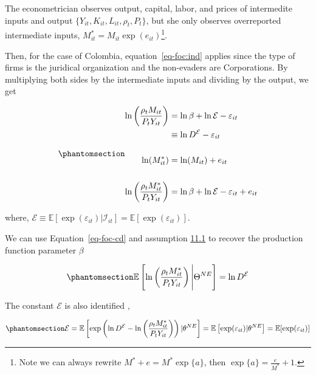 \documentclass[
  12pt]{article}
\theoremstyle{definition}
\theoremstyle{remark}
\begin{document}
The econometrician observes output, capital, labor, and prices of
intermedite inputs and output \(\{Y_{it},K_{it},L_{it},\rho_t, P_t\}\),
but she only observes overreported intermediate inputs,
\(M^*_{it}=M_{it}\exp(e_{it})\)\footnote{Note we can always rewrite
  \(M^*+e=M^*\exp\{a\}\), then \(\exp\{a\}=\frac{e}{M^*}+1\).}.

Then, for the case of Colombia, equation~\ref{eq-foc:ind} applies since
the type of firms is the juridical organization and the non-evaders are
Corporations. By multiplying both sides by the intermediate inputs and
dividing by the output, we get

\begin{equation}\phantomsection\label{eq-foc-cd}{
\begin{aligned}
    \ln\left(\frac{\rho_t M_{it}}{P_{t}Y_{it}}\right) &=\ln\beta + \ln \mathcal{E}- \varepsilon_{it} \\
    &\equiv \ln D^{\mathcal{E}}- \varepsilon_{it} \\
    &\\
    \ln(M^*_{it})&=\ln(M_{it})+e_{it} \\ 
    &\\
    \ln\left(\frac{\rho_t M^*_{it}}{P_{t}Y_{it}}\right) &=\ln\beta + \ln \mathcal{E}- \varepsilon_{it}+e_{it} \\
\end{aligned}
}\end{equation}

where,
\(\mathcal{E}\equiv \mathbb{E}[\exp(\varepsilon_{it})|\mathcal{I}_{it}]=\mathbb{E}[\exp(\varepsilon_{it})]\).

We can use Equation~\ref{eq-foc-cd} and assumption
\hyperref[ass-non-ev]{11.1} to recover the production function parameter
\(\beta\)

\begin{equation}\phantomsection\label{eq-foc-cd-exp}{
    \mathbb{E}\left[\ln\left(\frac{\rho_t M^*_{it}}{P_{t}Y_{it}}\right)\Bigg| \Theta^{NE}\right]=\ln D^{\mathcal{E}}
}\end{equation}

The constant \(\mathcal{E}\) is also identified \citep{Gandhi2020},

\begin{equation}\phantomsection\label{eq-id-E}{
\mathcal{E}=\mathbb{E}\left[\exp\left(\ln D^{\mathcal{E}}- \ln\left(\frac{\rho_t M^*_{it}}{P_{t}Y_{it}}\right)\right)|\theta^{NE}\right]=\mathbb{E}\left[\exp(\varepsilon_{it})|\theta^{NE}\right]=\mathbb{E}[\exp(\varepsilon_{it})]
}\end{equation}
\end{document}
